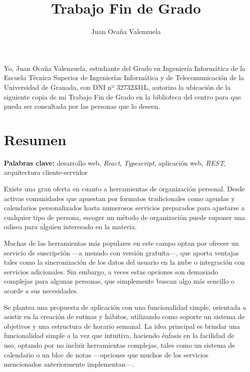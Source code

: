 \documentclass[10pt, a4paper]{aqademic}
\author{Juan Ocaña Valenzuela}
\title{Trabajo Fin de Grado}
\begin{document}
\AqMaketitle[%
	cover    = img/logo.png,
	org      = Grado en Ingeniería Informática,
	subtitle = Aplicación de gestión de rutinas semanales basada en tecnologías web,
	url		 = https://github.com/patchispatch/TFG,
	author   = Autor: Juan Ocaña Valenzuela\\Director: Sergio Alonso Burgos
]
\tableofcontents

\listoffigures

\newpage

Yo, Juan Ocaña Valenzuela, estudiante del Grado en Ingeniería Informática de la Escuela Técnica Superior de Ingenierías Informática y de Telecomunicación de la Universidad de Granada, con DNI nº 32732331L, autorizo la ubicación de la siguiente copia de mi Trabajo Fin de Grado en la biblioteca del centro para que pueda ser consultada por las personas que lo deseen.

\newpage

\section*{Resumen}
\textbf{Palabras clave:} desarrollo web, \textit{React}, \textit{Typescript}, aplicación web, \textit{REST}, arquitectura cliente-servidor

\bigskip

Existe una gran oferta en cuanto a herramientas de organización personal. Desde activas comunidades que apuestan por formatos tradicionales como agendas y calendarios personalizados hasta numerosos servicios preparados para ajustarse a cualquier tipo de persona, escoger un método de organización puede suponer una odisea para alguien interesado en la materia. 

\medskip

Muchas de las herramientas más populares en este campo optan por ofrecer un servicio de suscripción ---a menudo con versión gratuita---, que aporta ventajas tales como la sincronización de los datos del usuario en la nube o integración con servicios adicionales. Sin embargo, a veces estas opciones son demasiado complejas para algunas personas, que simplemente buscan algo más sencillo o acorde a sus necesidades.

\medskip

Se plantea una propuesta de aplicación con una funcionalidad simple, orientada a asistir en la creación de rutinas y hábitos, utilizando como soporte un sistema de objetivos y una estructura de horario semanal. La idea principal es brindar una funcionalidad simple a la vez que intuitiva, haciendo énfasis en la facilidad de uso, optando por no incluir herramientas complejas, tales como un sistema de calendario o un bloc de notas ---opciones que muchos de los servicios mencionados anteriormente implementan---.
\end{document}
